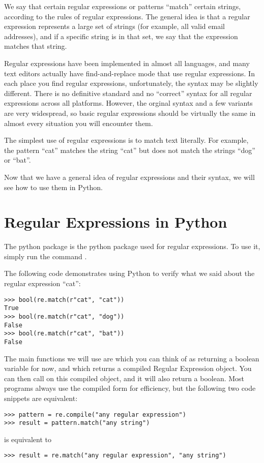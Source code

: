 We say that certain regular expressions or patterns ``match'' certain strings, according to the rules of regular expressions. The general idea is that a regular expression represents a large set of strings (for example, all valid email addresses), and if a specific string is in that set, we say that the expression matches that string.  

Regular expressions have been implemented in almost all languages, and many text editors actually have find-and-replace mode that use regular expressions. In each place you find regular expressions, unfortunately, the syntax may be slightly different. There is no definitive standard and no ``correct'' syntax for all regular expressions across all platforms. However, the orginal syntax and a few variants are very widespread, so basic regular expressions should be virtually the same in almost every situation you will encounter them.

The simplest use of regular expressions is to match text literally.
For example, the pattern ``cat'' matches the string ``cat'' but does not match the strings ``dog'' or ``bat''.

Now that we have a general idea of regular expressions and their syntax, we will see how to use them in Python.

\section*{Regular Expressions in Python}
The python package  is the python package used for regular expressions.
To use it, simply run the command .

The following code demonstrates using Python to verify what we said about the regular expression ``cat'':
\begin{lstlisting}
>>> bool(re.match(r"cat", "cat"))
True
>>> bool(re.match(r"cat", "dog"))
False
>>> bool(re.match(r"cat", "bat"))
False
\end{lstlisting}

The main functions we will use are  which you can think of as returning a boolean variable for now, and  which returns a compiled Regular Expression object. You can then call  on this compiled object, and it will also return a boolean.
Most programs always use the compiled form for efficiency, but the following two code snippets are equivalent:
\begin{lstlisting}
>>> pattern = re.compile("any regular expression")
>>> result = pattern.match("any string")
\end{lstlisting}
is equivalent to
\begin{lstlisting}
>>> result = re.match("any regular expression", "any string")
\end{lstlisting}

